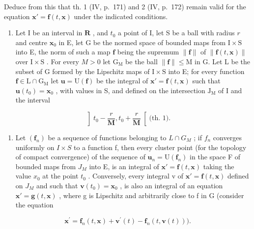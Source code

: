 Deduce from this that th. 1 (IV, p.~171) and 2 (IV, p.~172) remain valid for the equation \(\mathbf{x}' = \mathbf{f}(t, \mathbf{x})\) under the indicated conditions.

\begin{enumerate}
\def\labelenumi{* \arabic{enumi})}
\setcounter{enumi}{8}
\tightlist
\item
  Let I be an interval in \(\mathbf{R}\) , and \(t_0\) a point of I, let S be a ball with radius \(r\) and centre \(\mathbf{x}_0\) in E, let G be the normed space of bounded maps from \(\mathrm{I} \times \mathrm{S}\) into E, the norm of such a map \(\mathbf{f}\) being the supremum \(\| \mathbf{f} \|\) of \(\| \mathbf{f}(t, \mathbf{x}) \|\) over \(\mathrm{I} \times \mathrm{S}\) . For every \(M > 0\) let \(\mathrm{G}_{\mathrm{M}}\) be the ball \(\| \mathbf{f} \| \leqslant \mathrm{M}\) in G. Let L be the subset of G formed by the Lipschitz maps of \(\mathrm{I} \times \mathrm{S}\) into E; for every function \(\mathbf{f} \in \mathrm{L} \cap \mathrm{G}_{\mathrm{M}}\) let \(\mathbf{u} = \mathrm{U}(\mathbf{f})\) be the integral of \(\mathbf{x}' = \mathbf{f}(t, \mathbf{x})\) such that \(\mathbf{u}(t_0) = \mathbf{x}_0\) , with values in S, and defined on the intersection \(\mathrm{J}_{\mathrm{M}}\) of I and the interval
\end{enumerate}

\[
\left] t _ {0} - \frac {r}{\mathbf {M}}, t _ {0} + \frac {r}{\mathbf {M}} \right[ \text {(th. 1).}
\]

\begin{enumerate}
\def\labelenumi{\alph{enumi})}
\tightlist
\item
  Let \((\mathbf{f}_{n})\) be a sequence of functions belonging to \(L \cap G_{M}\) ; if \(f_{n}\) converges uniformly on \(I \times S\) to a function f, then every cluster point (for the topology of compact convergence) of the sequence of \(\mathbf{u}_{n} = \mathrm{U}(\mathbf{f}_{n})\) in the space F of bounded maps from \(J_{M}\) into E, is an integral of \(\mathbf{x}' = \mathbf{f}(t, \mathbf{x})\) taking the value \(x_{0}\) at the point \(t_{0}\) . Conversely, every integral v of \(\mathbf{x}' = \mathbf{f}(t, \mathbf{x})\) defined on \(J_{M}\) and such that \(\mathbf{v}(t_{0}) = \mathbf{x}_{0}\) , is also an integral of an equation \(\mathbf{x}' = \mathbf{g}(t, \mathbf{x})\) , where g is Lipschitz and arbitrarily close to f in G (consider the equation
\end{enumerate}

\[
\mathbf {x} ^ {\prime} = \mathbf {f} _ {n} (t, \mathbf {x}) + \mathbf {v} ^ {\prime} (t) - \mathbf {f} _ {n} (t, \mathbf {v} (t))).
\]

